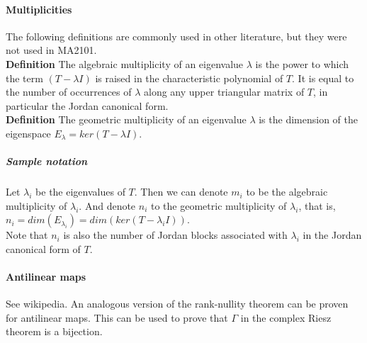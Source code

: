 \documentclass{article}
\begin{document}
\paragraph{Multiplicities} The following definitions are commonly used in other literature, but they were not used in MA2101.\\
\textbf{Definition} The algebraic multiplicity of an eigenvalue $\lambda$ is the power to which the term $(T-\lambda I)$ is raised in the characteristic polynomial of $T$. It is equal to the number of occurrences of $\lambda$ along any upper triangular matrix of $T$, in particular the Jordan canonical form.\\
\textbf{Definition} The geometric multiplicity of an eigenvalue $\lambda$ is the dimension of the eigenspace $E_\lambda=ker(T-\lambda I)$.

\subparagraph{Sample notation} Let $\lambda_i$ be the eigenvalues of $T$. Then we can denote $m_i$ to be the algebraic multiplicity of $\lambda_i$. And denote $n_i$ to the geometric multiplicity of $\lambda_i$, that is, $n_i=dim(E_{\lambda_i})=dim(ker(T-\lambda_iI))$.\\
Note that $n_i$ is also the number of Jordan blocks associated with $\lambda_i$ in the Jordan canonical form of $T$.

\paragraph{Antilinear maps} See wikipedia. An analogous version of the rank-nullity theorem can be proven for antilinear maps. This can be used to prove that $\Gamma$ in the complex Riesz theorem is a bijection.
\end{document}

